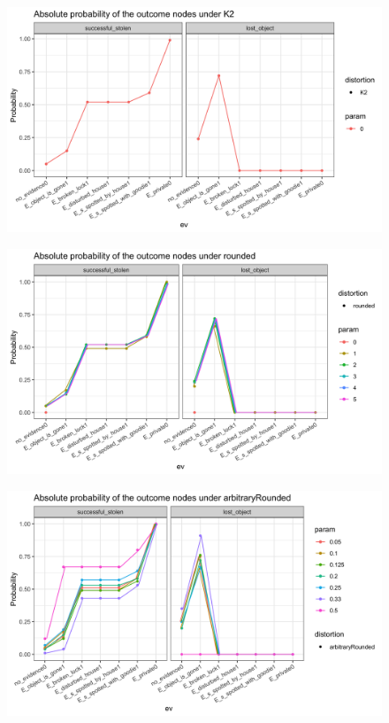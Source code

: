 \documentclass[11pt]{amsart}
\begin{document}
\begin{figure}[htbp]
\centering
\begin{center}
\includegraphics[scale=0.17]{images/K2absolute.png}
\label{default}
\end{center}
\end{figure}
\begin{figure}[htbp]
\centering
\begin{center}
\includegraphics[scale=0.17]{images/roundedabsolute.png}
\label{default}
\end{center}
\end{figure}
\begin{figure}[htbp]
\centering
\begin{center}
\includegraphics[scale=0.17]{images/arbitraryRoundedabsolute.png}
\label{default}
\end{center}
\end{figure}
\end{document}
